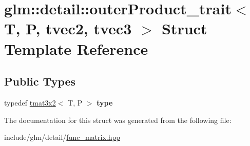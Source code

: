 \hypertarget{structglm_1_1detail_1_1outerProduct__trait_3_01T_00_01P_00_01tvec2_00_01tvec3_01_4}{}\section{glm\+:\+:detail\+:\+:outer\+Product\+\_\+trait$<$ T, P, tvec2, tvec3 $>$ Struct Template Reference}
\label{structglm_1_1detail_1_1outerProduct__trait_3_01T_00_01P_00_01tvec2_00_01tvec3_01_4}
\subsection*{Public Types}
\begin{DoxyCompactItemize}
\item 
\mbox{\label{structglm_1_1detail_1_1outerProduct__trait_3_01T_00_01P_00_01tvec2_00_01tvec3_01_4_a5b6c145bc27bf3a7d04336c578363bf7}} 
typedef \hyperlink{structglm_1_1tmat3x2}{tmat3x2}$<$ T, P $>$ {\bfseries type}
\end{DoxyCompactItemize}


The documentation for this struct was generated from the following file\+:\begin{DoxyCompactItemize}
\item 
include/glm/detail/\hyperlink{func__matrix_8hpp}{func\+\_\+matrix.\+hpp}\end{DoxyCompactItemize}
